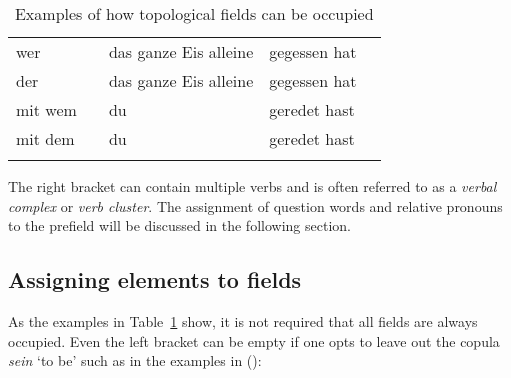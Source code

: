\begin{table}
\begin{sideways}
\begin{tabular}{lllll}
wer     &               & das ganze Eis alleine                  & gegessen hat \\
der     &               & das ganze Eis alleine                  & gegessen hat \\
mit wem &               & du                                     & geredet hast\\
mit dem &               & du                                     & geredet hast\\\lspbottomrule
\end{tabular}
\end{sideways}
\caption{\label{bsp-topo}Examples of how topological fields can be occupied}
\end{table}
The right bracket can contain multiple verbs and is often referred to as a \emph{verbal complex} or \emph{verb cluster}.
The assignment of question words and relative pronouns to the prefield will be discussed in the following section.

\subsection{Assigning elements to fields}

As the examples in Table~\ref{bsp-topo} show, it is not required that all fields are always occupied. Even the left bracket can be empty if one opts to leave out
the copula \emph{sein} `to be' such as in the examples in ():
\eal
\ex

